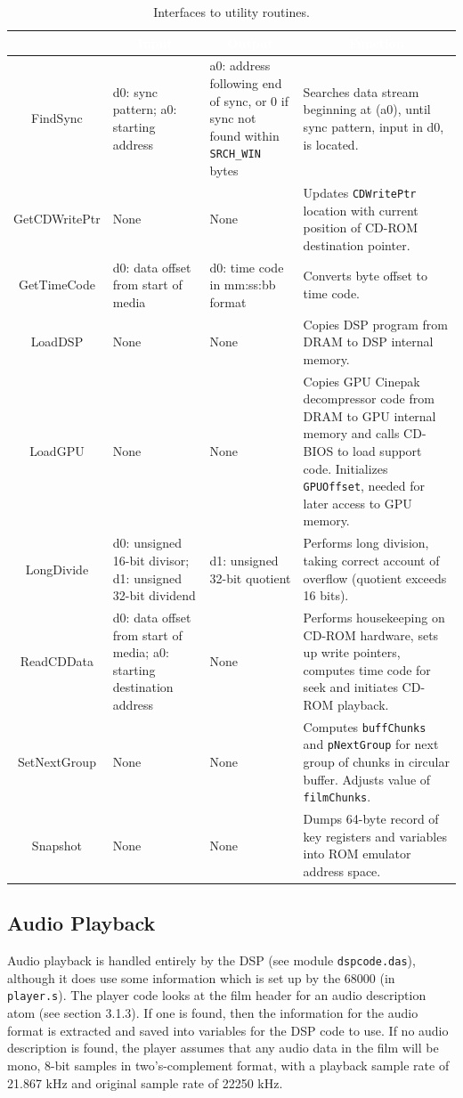 \documentclass[12pt,letterpaper,twoside]{article}
\newcommand{\tabheadtxt}[1]{\multicolumn{1}{c}{\textcolor{white}{\textbf{#1}}}}
\begin{document}
\begin{table}[h]
\centering
\begin{tabular}{|c|p{4cm}|p{4cm}|p{4cm}|}
\hline
\rowcolor{black}
\tabheadtxt{Routine} & \tabheadtxt{Input} & \tabheadtxt{Output} & \tabheadtxt{Function} \\
\hline
FindSync & d0: sync pattern; a0: starting address & a0: address following end of sync, or 0 if sync not found within \texttt{SRCH\_WIN} bytes & Searches data stream beginning at (a0), until sync pattern, input in d0, is located. \\
\hline
GetCDWritePtr & None & None & Updates \texttt{CDWritePtr} location with current position of CD-ROM destination pointer. \\
\hline
GetTimeCode & d0: data offset from start of media & d0: time code in mm:ss:bb format & Converts byte offset to time code. \\
\hline
LoadDSP & None & None & Copies DSP program from DRAM to DSP internal memory. \\
\hline
LoadGPU & None & None & Copies GPU Cinepak decompressor code from DRAM to GPU internal memory and calls CD-BIOS to load support code. Initializes \texttt{GPUOffset}, needed for later access to GPU memory. \\
\hline
LongDivide & d0: unsigned 16-bit divisor; d1: unsigned 32-bit dividend & d1: unsigned 32-bit quotient & Performs long division, taking correct account of overflow (quotient exceeds 16 bits). \\
\hline
ReadCDData & d0: data offset from start of media; a0: starting destination address & None & Performs housekeeping on CD-ROM hardware, sets up write pointers, computes time code for seek and initiates CD-ROM playback. \\
\hline
SetNextGroup & None & None & Computes \texttt{buffChunks} and \texttt{pNextGroup} for next group of chunks in circular buffer. Adjusts value of \texttt{filmChunks}. \\
\hline
Snapshot & None & None & Dumps 64-byte record of key registers and variables into ROM emulator address space. \\
\hline
\end{tabular}
\caption{Interfaces to utility routines.}
\label{tab:utilities}
\end{table}
\FloatBarrier

\subsection{Audio Playback}
Audio playback is handled entirely by the DSP (see module \texttt{dspcode.das}), although it does use some information which is set up by the 68000 (in \texttt{player.s}). The player code looks at the film header for an audio description atom (see section 3.1.3). If one is found, then the information for the audio format is extracted and saved into variables for the DSP code to use. If no audio description is found, the player assumes that any audio data in the film will be mono, 8-bit samples in two's-complement format, with a playback sample rate of 21.867 kHz and original sample rate of 22250 kHz.
\end{document}
